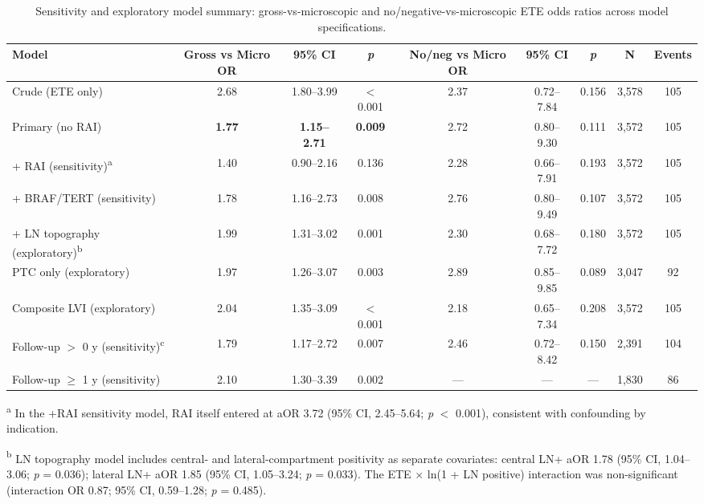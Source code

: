 \begin{landscape}
\begin{table}[htbp]
\centering
\scriptsize
\caption{Sensitivity and exploratory model summary: gross-vs-microscopic and no/negative-vs-microscopic ETE odds ratios across model specifications.}
\label{tab:sensitivity}
\begin{threeparttable}
\begin{tabular}{@{}lcccccccc@{}}
\toprule
\textbf{Model} & \textbf{Gross vs Micro OR} & \textbf{95\% CI} & \textbf{\textit{p}} & \textbf{No/neg vs Micro OR} & \textbf{95\% CI} & \textbf{\textit{p}} & \textbf{N} & \textbf{Events} \\
\midrule
Crude (ETE only) & 2.68 & 1.80--3.99 & $<$0.001 & 2.37 & 0.72--7.84 & 0.156 & 3{,}578 & 105 \\
Primary (no RAI) & \textbf{1.77} & \textbf{1.15--2.71} & \textbf{0.009} & 2.72 & 0.80--9.30 & 0.111 & 3{,}572 & 105 \\
+ RAI (sensitivity)\textsuperscript{a} & 1.40 & 0.90--2.16 & 0.136 & 2.28 & 0.66--7.91 & 0.193 & 3{,}572 & 105 \\
+ BRAF/TERT (sensitivity) & 1.78 & 1.16--2.73 & 0.008 & 2.76 & 0.80--9.49 & 0.107 & 3{,}572 & 105 \\
+ LN topography (exploratory)\textsuperscript{b} & 1.99 & 1.31--3.02 & 0.001 & 2.30 & 0.68--7.72 & 0.180 & 3{,}572 & 105 \\
PTC only (exploratory) & 1.97 & 1.26--3.07 & 0.003 & 2.89 & 0.85--9.85 & 0.089 & 3{,}047 & 92 \\
Composite LVI (exploratory) & 2.04 & 1.35--3.09 & $<$0.001 & 2.18 & 0.65--7.34 & 0.208 & 3{,}572 & 105 \\
Follow-up $>$ 0 y (sensitivity)\textsuperscript{c} & 1.79 & 1.17--2.72 & 0.007 & 2.46 & 0.72--8.42 & 0.150 & 2{,}391 & 104 \\
Follow-up $\geq$ 1 y (sensitivity) & 2.10 & 1.30--3.39 & 0.002 & --- & --- & --- & 1{,}830 & 86 \\
\bottomrule
\end{tabular}
\begin{tablenotes}
\scriptsize
\item[\textsuperscript{a}] In the +RAI sensitivity model, RAI itself entered at aOR 3.72 (95\% CI, 2.45--5.64; \textit{p} $<$ 0.001), consistent with confounding by indication.
\item[\textsuperscript{b}] LN topography model includes central- and lateral-compartment positivity as separate covariates: central LN+ aOR 1.78 (95\% CI, 1.04--3.06; \textit{p} = 0.036); lateral LN+ aOR 1.85 (95\% CI, 1.05--3.24; \textit{p} = 0.033). The ETE $\times$ ln(1 + LN positive) interaction was non-significant (interaction OR 0.87; 95\% CI, 0.59--1.28; \textit{p} = 0.485).

\end{tablenotes}
\end{threeparttable}
\end{table}
\end{landscape}
